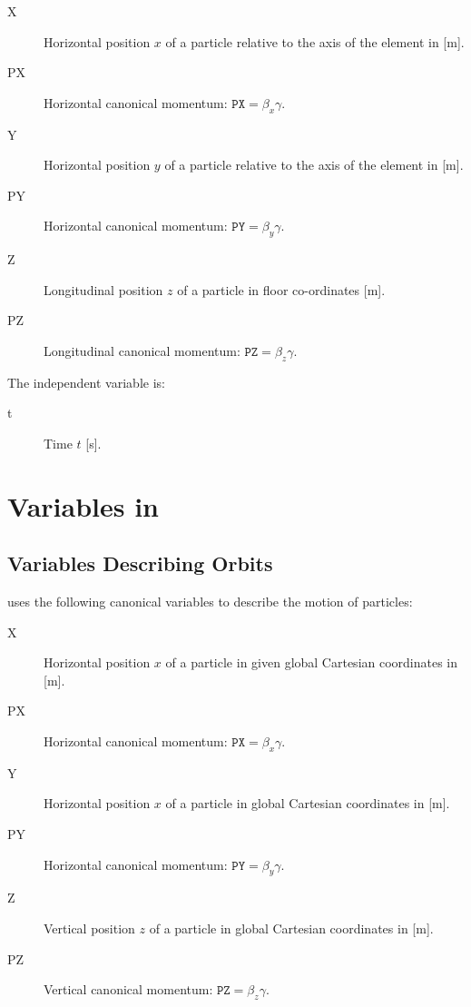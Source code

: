 \begin{description}
\item[X]
  Horizontal position $x$ of a particle relative to the axis of the element in [m].

\item[PX]
  Horizontal canonical momentum:
  $\mathtt{PX} = \beta_x \gamma$.

\item[Y]
  Horizontal position $y$ of a particle relative to the axis of the element in [m].

\item[PY]
  Horizontal canonical momentum:
  $\mathtt{PY} = \beta_y \gamma$.

\item[Z]
  Longitudinal position $z$ of a particle in floor co-ordinates [m].

\item[PZ]
 Longitudinal canonical momentum: 
 $\mathtt{PZ} = \beta_z \gamma$.

 \end{description}

The independent variable is:
\begin{description}
\item[t]
  Time $t$ [s].
\end{description}

\section{Variables in \opalcycl}
\label{sec:variablesopalcycl}

\subsection{Variables Describing Orbits}
\label{sec:canon}

\opalcycl uses the following canonical variables to describe the motion of particles:

\begin{description}
\item[X]
  Horizontal position $x$ of a particle in given global Cartesian coordinates in [m].

\item[PX]
  Horizontal canonical momentum:
  $\mathtt{PX} = \beta_x \gamma$.

\item[Y]
  Horizontal position $x$ of a particle in global Cartesian coordinates in [m].

\item[PY]
  Horizontal canonical momentum:
  $\mathtt{PY} = \beta_y \gamma$.

\item[Z]
  Vertical position $z$ of a particle in global Cartesian coordinates in [m].

\item[PZ]
  Vertical canonical momentum:
  $\mathtt{PZ} = \beta_z \gamma$.

\end{description}


